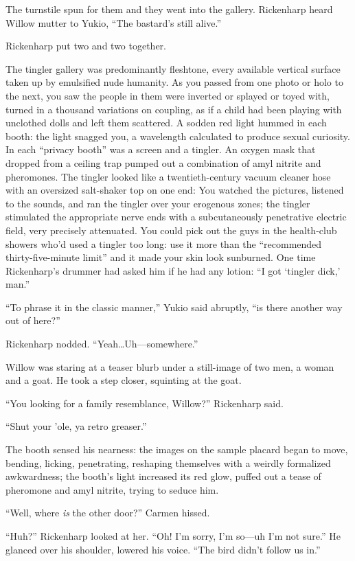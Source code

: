 The turnstile spun for them and they went into the gallery. Rickenharp heard Willow mutter to Yukio, ``The bastard's still alive.''

Rickenharp put two and two together.

The tingler gallery was predominantly fleshtone, every available vertical surface taken up by emulsified nude humanity. As you passed from one photo or holo to the next, you saw the people in them were inverted or splayed or toyed with, turned in a thousand variations on coupling, as if a child had been playing with unclothed dolls and left them scattered. A sodden red light hummed in each booth: the light snagged you, a wavelength calculated to produce sexual curiosity. In each ``privacy booth'' was a screen and a tingler. An oxygen mask that dropped from a ceiling trap pumped out a combination of amyl nitrite and pheromones. The tingler looked like a twentieth-century vacuum cleaner hose with an oversized salt-shaker top on one end: You watched the pictures, listened to the sounds, and ran the tingler over your erogenous zones; the tingler stimulated the appropriate nerve ends with a subcutaneously penetrative electric field, very precisely attenuated. You could pick out the guys in the health-club showers who'd used a tingler too long: use it more than the ``recommended thirty-five-minute limit'' and it made your skin look sunburned. One time Rickenharp's drummer had asked him if he had any lotion: ``I got ‘tingler dick,' man.''

``To phrase it in the classic manner,'' Yukio said abruptly, ``is there another way out of here?''

Rickenharp nodded. ``Yeah\ldots Uh---somewhere.''

Willow was staring at a teaser blurb under a still-image of two men, a woman and a goat. He took a step closer, squinting at the goat.

``You looking for a family resemblance, Willow?'' Rickenharp said.

``Shut your 'ole, ya retro greaser.''

The booth sensed his nearness: the images on the sample placard began to move, bending, licking, penetrating, reshaping themselves with a weirdly formalized awkwardness; the booth's light increased its red glow, puffed out a tease of pheromone and amyl nitrite, trying to seduce him.

``Well, where \textit{is} the other door?'' Carmen hissed.

``Huh?'' Rickenharp looked at her. ``Oh! I'm sorry, I'm so---uh I'm not sure.'' He glanced over his shoulder, lowered his voice. ``The bird didn't follow us in.''

